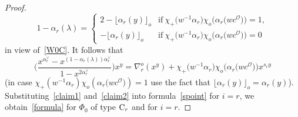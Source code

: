 \documentclass[pdftex]{sigma}
\numberwithin{equation}{section}
\begin{document}
\begin{proof}
\begin{equation*}
1-\alpha_r(\lambda)=
\begin{cases}
2-\lfloor\alpha_r(y)\rfloor_o &\text{if}\ \chi_+\bigl(w^{-1}\alpha_r\bigr)\chi_o\bigl(\alpha_r\bigl(wc^\mathcal{O}\bigr)\bigr)=1,\\
-\lfloor\alpha_r(y)\rfloor_o &\text{if}\ \chi_+\bigl(w^{-1}\alpha_r\bigr)\chi_o\bigl(\alpha_r\bigl(wc^\mathcal{O}\bigr)\bigr)=0
\end{cases}
\end{equation*}
in view of~\eqref{W0C}. It follows that
\begin{equation}\label{claim2}
\Biggl(\frac{x^{\alpha_r^\vee}-x^{(1-\alpha_r(\lambda))\alpha_r^\vee}}{1-x^{2\alpha_r^\vee}}\Biggr)x^y=
\nabla_r^o(x^y)+
\chi_+\bigl(w^{-1}\alpha_r\bigr)\chi_o\bigl(\alpha_r\bigl(wc^\mathcal{O}\bigr)\bigr)
x^{s_ry}
\end{equation}
(in case $\chi_+(w^{-1}\alpha_r)\chi_o(\alpha_r\bigl(wc^\mathcal{O}\bigr))=1$ use the fact that $\lfloor\alpha_r(y)\rfloor_o=\alpha_r(y)$).
Substituting~\eqref{claim1} and~\eqref{claim2} into formula~\eqref{spoint} for $i=r$, we obtain~\eqref{formula} for $\Phi_0$ of type ${\rm C}_r$ and for $i=r$.


\end{proof}
\end{document}
